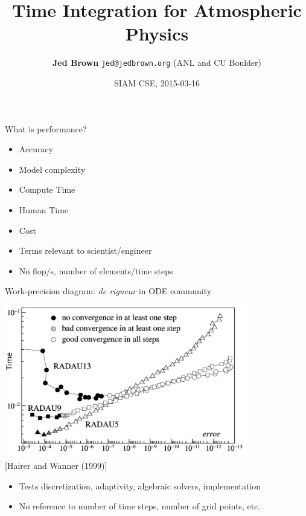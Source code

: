 \documentclass{beamer}
\title{Time Integration for Atmospheric Physics}
\author{{\bf Jed Brown} \texttt{jed@jedbrown.org} (ANL and CU Boulder)}
\date{SIAM CSE, 2015-03-16}
\begin{document}
\lstset{language=C}
\normalem

\begin{frame}
  \titlepage
\end{frame}

\begin{frame}{What is performance?}
  \begin{block}{}
    \begin{itemize}
    \item Accuracy
    \item Model complexity
    \item Compute Time
    \item Human Time
    \item Cost
    \end{itemize}
  \end{block}
  \begin{itemize}
  \item Terms relevant to scientist/engineer
  \item No flop/s, number of elements/time steps
  \end{itemize}
\end{frame}

\begin{frame}{Work-precision diagram: \emph{de rigueur} in ODE community}
  \begin{center}
    \includegraphics[width=0.8\textwidth]{figures/HairerWanner-WorkPrecision.png}\\
    {\scriptsize [Hairer and Wanner (1999)]}
  \end{center}
  \begin{itemize}
  \item Tests discretization, adaptivity, algebraic solvers, implementation
  \item No reference to number of time steps, number of grid points, etc.
  \end{itemize}
\end{frame}
\end{document}
